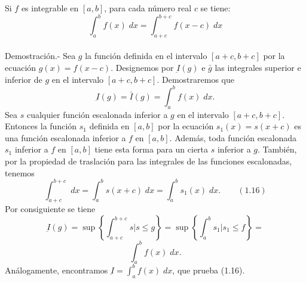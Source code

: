 \begin{multicols}{2}
\begin{teo}
\end{teo}

\begin{teo} Si $f$ es integrable en $[a,b]$, para cada número real $c$ se tiene: $$\int_a^b f(x) \; dx = \int_{a+c}^{b+c} f(x-c)\; dx$$\\
    Demostración.-\; Sea $g$ la función definida en el intervalo $[a+c,b+c]$ por la ecuación $g(x) = f(x-c)$. Designemos por $\underbar{I}(g)$ e $\bar{g}$ las integrales superior e inferior de $g$ en el intervalo $[a+c,b+c]$. Demostraremos que $$\underbar{I}(g) = \bar{I}(g) = \int_a^b f(x) \; dx.$$
    Sea $s$ cualquier función escalonada inferior a $g$ en el intervalo $[a+c,b+c]$. Entonces la función $s_1$ definida en $[a,b]$ por la ecuación $s_1(x) = s(x+c)$ es una función escalonada inferior a $f$ en $[a,b]$. Además, toda función escalonada $s_1$ inferior a $f$ en $[a,b]$ tiene esta forma para un cierta $s$ inferior a $g$. También, por la propiedad de traslación para las integrales de las funciones escalonadas, tenemos $$\int_{a+c}^{b+c} \; dx = \int_a^b s(x+c)\; dx = \int_a^b s_1(x)\; dx. \qquad (1.16)$$
    Por consiguiente se tiene $$\underbar{I}(g) = \sup\left\{\int_{a+c}^{b+c} s | s \leq g\right\} =  \sup \left\{\int_a^b s_1 | s_1 \leq f\right\} =$$$$ \int_a^b f(x) \; dx.$$
    Análogamente, encontramos $\underbar{I} = \int_a^b f(x)\; dx$, que prueba (1.16).\\\\ 
    
\end{teo}


\end{multicols}
